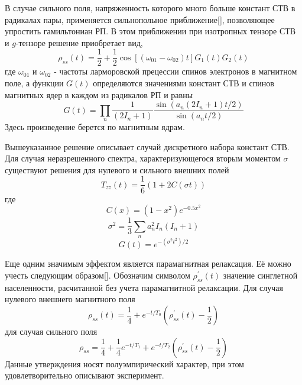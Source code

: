 \documentclass[14pt,titlepage]{extarticle}
\begin{document}
В случае сильного поля, напряженность которого много больше констант СТВ в радикалах пары, применяется сильнопольное приближение[], позволяющее упростить гамильтониан РП. В этом приближении при изотропных тензоре СТВ и \(g\)-тензоре решение приобретает вид,
\begin{equation} \rho_{ss}(t)=\frac{1}{2}+\frac{1}{2}\cos\left[(\omega_{01}-\omega_{02})t\right] G_1(t) G_2(t) \end{equation}
где \(\omega_{01}\) и  \(\omega_{02}\) - частоты ларморовской прецессии спинов электронов в магнитном поле, а функции \( G(t) \) определяются значениями констант СТВ и спинов магнитных ядер в каждом из радикалов РП и равны
\begin{equation} G(t)=\prod_{n} \frac{1}{(2I_n+1)}\frac{\sin(a_n(2I_n+1)t/2)}{\sin(a_nt/2)} \end{equation}
Здесь произведение берется по магнитным ядрам.

Вышеуказанное решение описывает случай дискретного набора констант СТВ. Для случая неразрешенного спектра, характеризующегося вторым моментом \(\sigma\) существуют решения для нулевого и сильного внешних полей
\begin{equation} T_{zz}(t)=\frac{1}{6}(1+2C(\sigma t)) \end{equation}
где
\begin{equation} C(x)=(1-x^2)e^{-0.5x^2} \end{equation}
\begin{equation} \sigma^2=\frac{1}{3}\sum_{n}a_n^2I_n(I_n+1) \end{equation}
\begin{equation} G(t)=e^{-(\sigma^2t^2)/2} \end{equation}

Еще одним значимым эффектом является парамагнитная релаксация. Её можно учесть следующим образом[]. Обозначим символом \(\rho_{ss}^{'}(t)\)  значение синглетной населенности, расчитанной без учета парамагнитной релаксации. Для случая нулевого внешнего магнитного поля
\begin{equation} \rho_{ss}(t)=\frac{1}{4}+e^{-t/T_0}\left ( \rho_{ss}^{'}(t) - \frac{1}{2} \right ) \end{equation}
для случая сильного поля
\begin{equation} \rho_{ss}=\frac{1}{4}+\frac{1}{4}e^{-t/T_1}+e^{-t/T_2} \left ( \rho_{ss}^{'}(t) - \frac{1}{2} \right ) \end{equation}
Данные утверждения носят полуэмпирический характер, при этом удовлетворительно описывают эксперимент.
\end{document}
